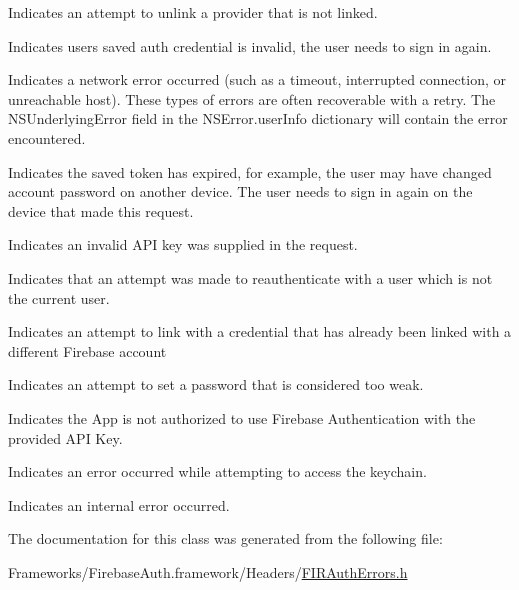 Indicates an attempt to unlink a provider that is not linked.

Indicates user\textquotesingle{}s saved auth credential is invalid, the user needs to sign in again.

Indicates a network error occurred (such as a timeout, interrupted connection, or unreachable host). These types of errors are often recoverable with a retry. The {\ttfamily N\+S\+Underlying\+Error} field in the {\ttfamily N\+S\+Error.\+user\+Info} dictionary will contain the error encountered.

Indicates the saved token has expired, for example, the user may have changed account password on another device. The user needs to sign in again on the device that made this request.

Indicates an invalid A\+P\+I key was supplied in the request.

Indicates that an attempt was made to reauthenticate with a user which is not the current user.

Indicates an attempt to link with a credential that has already been linked with a different Firebase account

Indicates an attempt to set a password that is considered too weak.

Indicates the App is not authorized to use Firebase Authentication with the provided A\+P\+I Key.

Indicates an error occurred while attempting to access the keychain.

Indicates an internal error occurred.

The documentation for this class was generated from the following file\+:\begin{DoxyCompactItemize}
\item 
Frameworks/\+Firebase\+Auth.\+framework/\+Headers/\hyperlink{_f_i_r_auth_errors_8h}{F\+I\+R\+Auth\+Errors.\+h}\end{DoxyCompactItemize}
